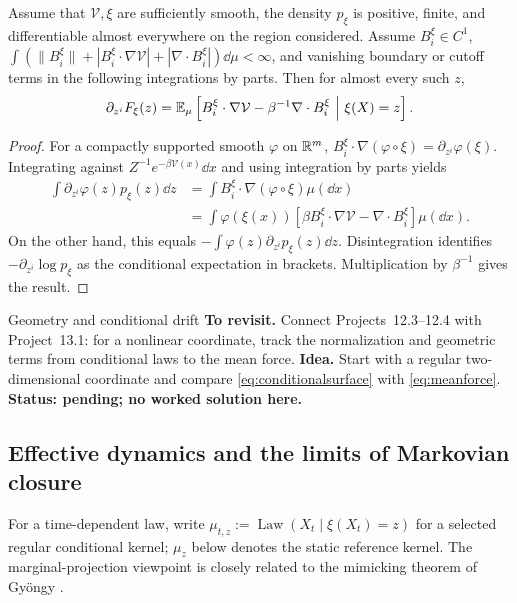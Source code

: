 \documentclass[12pt,a4paper,oneside]{book}
\begin{document}
\begin{theorem}
\label{thm:meanforce}
\label{src:p12q4}
Assume that $\mathcal V,\xi$ are sufficiently smooth, the density $p_\xi$ is
positive, finite, and differentiable almost everywhere on the region
considered. Assume $B_i^\xi\in C^1$,
$\int(\|B_i^\xi\|+|B_i^\xi\cdot\nabla\mathcal V|+|\nabla\cdot B_i^\xi|)\dd\mu<\infty$,
and vanishing boundary or cutoff terms in the following integrations
by parts. Then for almost every such $z$,
\begin{equation}
 \partial_{z^i}F_\xi(z)
 =\mathbb{E}_\mu\left[B_i^\xi\cdot\nabla\mathcal V-\beta^{-1}\nabla\cdot B_i^\xi
 \ \middle|\ \xi(X)=z\right].
\label{eq:meanforce}
\end{equation}
\end{theorem}
\begin{proof}
For a compactly supported smooth $\varphi$ on $\mathbb{R}^m$,
$B_i^\xi\cdot\nabla(\varphi\circ\xi)=\partial_{z^i}\varphi(\xi)$.
Integrating against $Z^{-1}e^{-\beta \mathcal V(x)}\dd x$ and using integration
by parts yields
\begin{equation*}
\begin{aligned}
 \int\partial_{z^i}\varphi(z)p_\xi(z)\dd z
 &=\int B_i^\xi\cdot\nabla(\varphi\circ\xi)\mu(\dd x)\\
 &=\int\varphi(\xi(x))
 [\beta B_i^\xi\cdot\nabla\mathcal V-\nabla\cdot B_i^\xi]\mu(\dd x).
\end{aligned}
\end{equation*}
On the other hand, this equals $-\int\varphi(z)\partial_{z^i}p_\xi(z)\dd z$.
Disintegration identifies $-\partial_{z^i}\log p_\xi$ as the conditional
expectation in brackets. Multiplication by $\beta^{-1}$ gives the result.
\end{proof}

\begin{futurethought}{Geometry and conditional drift}
\textbf{To revisit.} Connect Projects~12.3--12.4 with Project~13.1:
for a nonlinear coordinate, track the normalization and geometric terms
from conditional laws to the mean force.
\textbf{Idea.} Start with a regular two-dimensional coordinate and compare
\eqref{eq:conditionalsurface} with \eqref{eq:meanforce}.
\textbf{Status: pending; no worked solution here.}
\end{futurethought}


\subsection{Effective dynamics and the limits of Markovian closure}
\label{subsec:effective}\label{ch:effective}
For a time-dependent law, write $\mu_{t,z}:=\operatorname{Law}(X_t\mid\xi(X_t)=z)$ for a selected regular conditional kernel; $\mu_z$ below denotes the static reference kernel. The marginal-projection viewpoint is closely related to the mimicking theorem of Gy\"ongy \cite{gyongy1986}.
\end{document}

